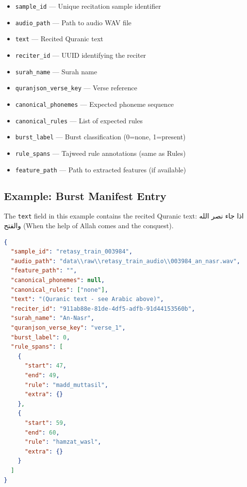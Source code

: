\begin{itemize}
  \item \texttt{sample\_id} — Unique recitation sample identifier
  \item \texttt{audio\_path} — Path to audio WAV file
  \item \texttt{text} — Recited Quranic text
  \item \texttt{reciter\_id} — UUID identifying the reciter
  \item \texttt{surah\_name} — Surah name
  \item \texttt{quranjson\_verse\_key} — Verse reference
  \item \texttt{canonical\_phonemes} — Expected phoneme sequence
  \item \texttt{canonical\_rules} — List of expected rules
  \item \texttt{burst\_label} — Burst classification (0=none, 1=present)
  \item \texttt{rule\_spans} — Tajweed rule annotations (same as Rules)
  \item \texttt{feature\_path} — Path to extracted features (if available)
\end{itemize}

\subsection{Example: Burst Manifest Entry}

The \texttt{text} field in this example contains the recited Quranic text: \textarabic{اذا جاء نصر الله والفتح} (When the help of Allah comes and the conquest).

\begin{lstlisting}[language=json, caption=Burst Manifest Example]
{
  "sample_id": "retasy_train_003984",
  "audio_path": "data\\raw\\retasy_train_audio\\003984_an_nasr.wav",
  "feature_path": "",
  "canonical_phonemes": null,
  "canonical_rules": ["none"],
  "text": "(Quranic text - see Arabic above)",
  "reciter_id": "911ab88e-81de-4df5-adfb-91d44153560b",
  "surah_name": "An-Nasr",
  "quranjson_verse_key": "verse_1",
  "burst_label": 0,
  "rule_spans": [
    {
      "start": 47,
      "end": 49,
      "rule": "madd_muttasil",
      "extra": {}
    },
    {
      "start": 59,
      "end": 60,
      "rule": "hamzat_wasl",
      "extra": {}
    }
  ]
}
\end{lstlisting}

